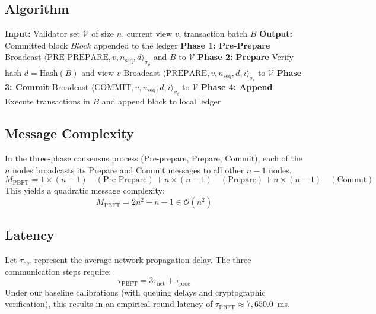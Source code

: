\documentclass[12pt, oneside, a4paper]{report}
\theoremstyle{definition}
\theoremstyle{remark}
\begin{document}
\subsection{Algorithm}
\begin{algorithm}[H]
\caption{Classic PBFT Consensus Round}
\label{alg:pbft}
\begin{algorithmic}[1]
\STATE \textbf{Input:} Validator set $\mathcal{V}$ of size $n$, current view $v$, transaction batch $B$
\STATE \textbf{Output:} Committed block $Block$ appended to the ledger
\STATE \textbf{Phase 1: Pre-Prepare}
    \STATE Broadcast $\langle\text{PRE-PREPARE}, v, n_{\mathrm{seq}}, d\rangle_{\sigma_p}$ and $B$ to $\mathcal{V}$
\ENDIF
\STATE \textbf{Phase 2: Prepare}
    \STATE Verify hash $d = \mathrm{Hash}(B)$ and view $v$
    \STATE Broadcast $\langle\text{PREPARE}, v, n_{\mathrm{seq}}, d, i\rangle_{\sigma_i}$ to $\mathcal{V}$
\ENDIF
\STATE \textbf{Phase 3: Commit}
    \STATE Broadcast $\langle\text{COMMIT}, v, n_{\mathrm{seq}}, d, i\rangle_{\sigma_i}$ to $\mathcal{V}$
\ENDIF
\STATE \textbf{Phase 4: Append}
    \STATE Execute transactions in $B$ and append block to local ledger
\ENDIF
\end{algorithmic}
\end{algorithm}

\subsection{Message Complexity}
In the three-phase consensus process (Pre-prepare, Prepare, Commit), each of the $n$ nodes broadcasts its Prepare and Commit messages to all other $n-1$ nodes.
\begin{equation}
M_{\mathrm{PBFT}} = 1 \times (n-1) \quad (\text{Pre-Prepare}) + n \times (n-1) \quad (\text{Prepare}) + n \times (n-1) \quad (\text{Commit})
\end{equation}
This yields a quadratic message complexity:
\begin{equation}
M_{\mathrm{PBFT}} = 2n^2 - n - 1 \in \mathcal{O}(n^2)
\end{equation}

\subsection{Latency}
Let $\tau_{\mathrm{net}}$ represent the average network propagation delay. The three communication steps require:
\begin{equation}
\tau_{\mathrm{PBFT}} = 3 \tau_{\mathrm{net}} + \tau_{\mathrm{proc}}
\end{equation}
Under our baseline calibrations (with queuing delays and cryptographic verification), this results in an empirical round latency of $\tau_{\mathrm{PBFT}} \approx 7{,}650.0$~ms.
\end{document}
